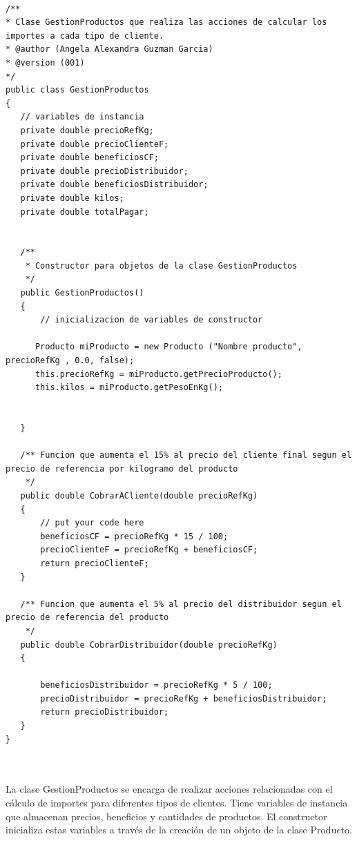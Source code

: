 \documentclass[10pt,a4paper]{article}
\def\StartLineAt#1{\lstset{firstnumber=#1}}
\begin{document}
\StartLineAt{1}
\begin{lstlisting}[style=Java]
  
/**
* Clase GestionProductos que realiza las acciones de calcular los importes a cada tipo de cliente.
* @author (Angela Alexandra Guzman Garcia) 
* @version (001)
*/
public class GestionProductos 
{
   // variables de instancia
   private double precioRefKg;
   private double precioClienteF;
   private double beneficiosCF;
   private double precioDistribuidor;
   private double beneficiosDistribuidor;
   private double kilos;
   private double totalPagar;
 

   /**
    * Constructor para objetos de la clase GestionProductos
    */
   public GestionProductos()
   {
       // inicializacion de variables de constructor
      
      Producto miProducto = new Producto ("Nombre producto", precioRefKg , 0.0, false);
      this.precioRefKg = miProducto.getPrecioProducto();
      this.kilos = miProducto.getPesoEnKg();
      
       
   }

   /** Funcion que aumenta el 15% al precio del cliente final segun el precio de referencia por kilogramo del producto
    */
   public double CobrarACliente(double precioRefKg)
   {
       // put your code here
       beneficiosCF = precioRefKg * 15 / 100;
       precioClienteF = precioRefKg + beneficiosCF;
       return precioClienteF;
   }
   
   /** Funcion que aumenta el 5% al precio del distribuidor segun el precio de referencia del producto
    */
   public double CobrarDistribuidor(double precioRefKg)
   {
      
       beneficiosDistribuidor = precioRefKg * 5 / 100;
       precioDistribuidor = precioRefKg + beneficiosDistribuidor;
       return precioDistribuidor;
   }
}

  
\end{lstlisting}

La clase GestionProductos se encarga de realizar acciones relacionadas con el cálculo de importes para diferentes tipos de clientes. Tiene variables de instancia que almacenan precios, beneficios y cantidades de productos. El constructor inicializa estas variables a través de la creación de un objeto de la clase Producto.
\end{document}
